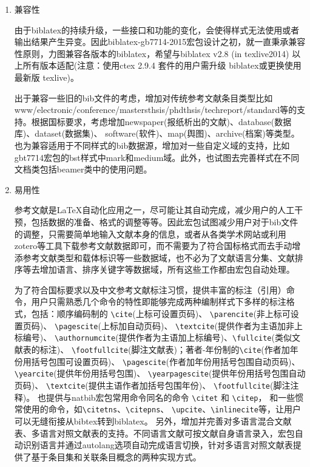 \documentclass[11pt]{article} %
\begin{document}
\begin{enumerate}
  \item 兼容性

由于biblatex的持续升级，一些接口和功能的变化，会使得样式无法使用或者输出结果产生异变。因此biblatex-gb7714-2015宏包设计之初，就一直秉承兼容性原则，力图兼容各版本的biblatex，希望与biblatex v2.8 (in texlive2014) 以上所有版本适配(注意：使用ctex 2.9.4 套件的用户需升级 biblatex或更换使用最新版 texlive)。

出于兼容一些旧的bib文件的考虑，增加对传统参考文献条目类型比如www/electronic/conference/mastersthsis/phdthsis/techreport/standard等的支持。根据国标要求，考虑增加newspaper(报纸析出的文献)、database(数据库)、dataset(数据集)、 software(软件)、map(舆图)、archive(档案)等类型。也为兼容适用于不同样式的bib数据源，增加对一些自定义域的支持，比如gbt7714宏包的bst样式中mark和medium域。此外，也试图去完善样式在不同文档类包括beamer类中的使用问题。

  \item 易用性

参考文献是\LaTeX{}自动化应用之一，尽可能让其自动完成，减少用户的人工干预，包括数据的准备、格式的调整等等。因此宏包试图减少用户对于bib文件的调整，只需要简单地输入文献本身的信息，或者从各类学术网站或利用zotero等工具下载参考文献数据即可，而不需要为了符合国标格式而去手动增添参考文献类型和载体标识等一些数据域，也不必为了文献语言分集、文献排序等去增加语言、排序关键字等数据域，所有这些工作都由宏包自动处理。

为了符合国标要求以及中文参考文献标注习惯，提供丰富的标注（引用）命令，用户只需熟悉几个命令的特性即能够完成两种编制样式下多样的标注格式，包括：顺序编码制的 \verb|\cite|(上标可设置页码)、 \verb|\parencite|(非上标可设置页码)、 \verb|\pagescite|(上标加自动页码)、 \verb|\textcite|(提供作者为主语加非上标编号)、 \verb|\authornumcite|(提供作者为主语加上标编号)、\verb|\fullcite|(类似文献表的标注)、 \verb|\footfullcite|(脚注文献表)；著者-年份制的\verb|\cite|(作者加年份用括号包围可设置页码)、 \verb|\pagescite|(作者加年份用括号包围自动页码)、
\verb|\yearcite|(提供年份用括号包围)、 \verb|\yearpagescite|(提供年份用括号包围自动页码)、
\verb|\textcite|(提供主语作者加括号包围年份)、 \verb|\footfullcite|(脚注注释)。
也提供与natbib宏包常用命令同名的命令 \verb|\citet| 和 \verb|\citep|，
和一些惯常使用的命令，如\verb|\citetns|、\verb|\citepns|、
\verb|\upcite|、\verb|\inlinecite|等，让用户可以无缝衔接从bibtex转到biblatex。
另外，增加并完善对多语言混合文献表、多语言对照文献表的支持。不同语言文献可按文献自身语言录入，宏包自动识别语言并通过autolang选项自动完成语言切换，针对多语言对照文献表提供了基于条目集和关联条目概念的两种实现方式。



\end{enumerate}
\end{document}
